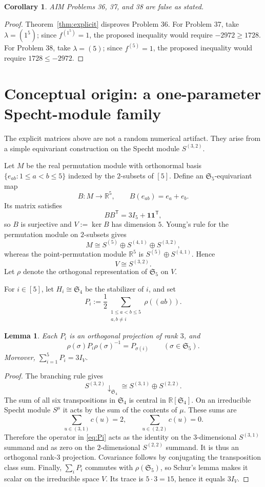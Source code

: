 \documentclass[11pt]{article}
\newtheorem{lemma}[theorem]{Lemma}
\newtheorem{corollary}[theorem]{Corollary}
\theoremstyle{remark}
\newcommand{\R}{\mathbb R}
\newcommand{\Sym}{\mathfrak S}
\newcommand{\one}{\mathbf 1}
\begin{document}
\begin{corollary}
AIM Problems 36, 37, and 38 are false as stated.
\end{corollary}

\begin{proof}
Theorem~\ref{thm:explicit} disproves Problem 36.  For Problem 37, take
$\lambda=(1^5)$; since $f^{(1^5)}=1$, the proposed inequality would require
$-2972\ge1728$.  For Problem 38, take $\lambda=(5)$; since $f^{(5)}=1$, the
proposed inequality would require $1728\le-2972$.
\end{proof}

\section{Conceptual origin: a one-parameter Specht-module family}

The explicit matrices above are not a random numerical artifact.  They arise
from a simple equivariant construction on the Specht module $S^{(3,2)}$.

Let $M$ be the real permutation module with orthonormal basis
$\{e_{ab}:1\le a<b\le5\}$ indexed by the $2$-subsets of $[5]$.  Define an
$\Sym_5$-equivariant map
\[
B:M\longrightarrow\R^5,\qquad B(e_{ab})=e_a+e_b.
\]
Its matrix satisfies
\[
BB^{\mathsf T}=3I_5+\one\one^{\mathsf T},
\]
so $B$ is surjective and $V:=\ker B$ has dimension $5$.  Young's rule for the
permutation module on $2$-subsets gives
\[
M\cong S^{(5)}\oplus S^{(4,1)}\oplus S^{(3,2)},
\]
whereas the point-permutation module $\R^5$ is
$S^{(5)}\oplus S^{(4,1)}$.  Hence
\[
V\cong S^{(3,2)}.
\]
Let $\rho$ denote the orthogonal representation of $\Sym_5$ on $V$.

For $i\in[5]$, let $H_i\cong\Sym_4$ be the stabilizer of $i$, and set
\begin{equation}
P_i:=\frac12
\sum_{\substack{1\le a<b\le5\\a,b\ne i}}
\rho((ab)).
\label{eq:Pi}
\end{equation}

\begin{lemma}
Each $P_i$ is an orthogonal projection of rank $3$, and
\[
\rho(\sigma)P_i\rho(\sigma)^{-1}=P_{\sigma(i)}
\qquad(\sigma\in\Sym_5).
\]
Moreover, $\sum_{i=1}^5P_i=3I_V$.
\end{lemma}

\begin{proof}
The branching rule gives
\[
S^{(3,2)}\!\downarrow_{\Sym_4}
\cong S^{(3,1)}\oplus S^{(2,2)}.
\]
The sum of all six transpositions in $\Sym_4$ is central in $\R[\Sym_4]$.
On an irreducible Specht module $S^\mu$ it acts by the sum of the contents of
$\mu$.  These sums are
\[
\sum_{u\in(3,1)}c(u)=2,
\qquad
\sum_{u\in(2,2)}c(u)=0.
\]
Therefore the operator in \eqref{eq:Pi} acts as the identity on the
$3$-dimensional $S^{(3,1)}$ summand and as zero on the $2$-dimensional
$S^{(2,2)}$ summand.  It is thus an orthogonal rank-$3$ projection.  Covariance
follows by conjugating the transposition class sum.  Finally, $\sum_iP_i$
commutes with $\rho(\Sym_5)$, so Schur's lemma makes it scalar on the irreducible
space $V$.  Its trace is $5\cdot3=15$, hence it equals $3I_V$.
\end{proof}
\end{document}

